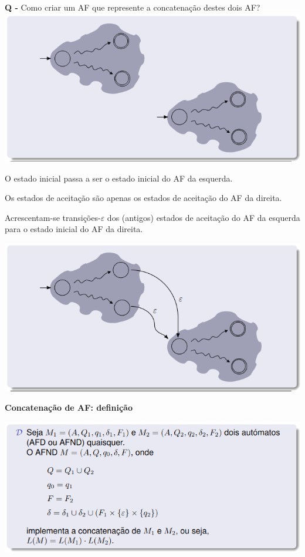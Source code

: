 \documentclass{article}
\begin{document}
\begin{flushleft}
  \begin{center}
    \textbf{Q -} Como criar um AF que represente a concatenação destes dois AF?
    \includegraphics[scale=0.4]{63}
  \end{center}

  \begin{center}
    O estado inicial passa a ser o estado inicial do AF da esquerda.

    Os estados de aceitação são apenas os estados de aceitação do AF da direita.

    Acrescentam-se transições-$\varepsilon$ dos (antigos) estados de aceitação do AF da esquerda
    para o estado inicial do AF da direita.

    \includegraphics[scale=0.4]{64}
  \end{center}

  \pagebreak

  \textbf{Concatenação de AF: definição}

  \begin{center}
    \includegraphics[scale=0.4]{65}
  \end{center}


\end{flushleft}
\end{document}

